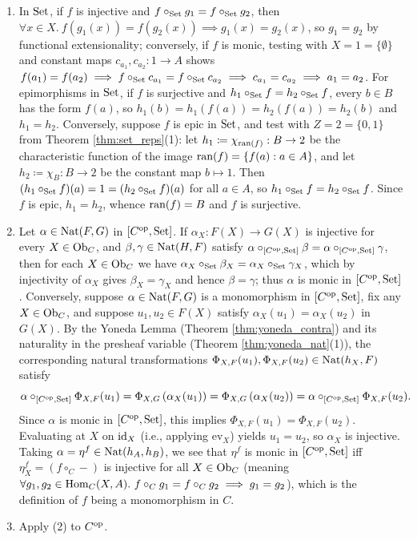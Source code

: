 \documentclass[10pt,a4paper]{article}
\begin{document}
\begin{enumerate}
\item In ${\textrm{Set}}$, if $f$ is injective and $f \circ_{\textrm{Set}} g_1 = f \circ_{\textrm{Set}} g_2$, then $\forall x \in X.\ f(g_1(x)) = f(g_2(x)) \implies g_1(x) = g_2(x)$, so $g_1 = g_2$ by functional extensionality; conversely, if $f$ is monic, testing with $X = 1 = \{\emptyset\}$ and constant maps $c_{a_1}, c_{a_2} : 1 \to A$ shows $f(a_1) = f(a_2) \implies f \circ_{\textrm{Set}} c_{a_1} = f \circ_{\textrm{Set}} c_{a_2} \implies c_{a_1} = c_{a_2} \implies a_1 = a_2$. For epimorphisms in ${\textrm{Set}}$, if $f$ is surjective and $h_1 \circ_{\textrm{Set}} f = h_2 \circ_{\textrm{Set}} f$, every $b \in B$ has the form $f(a)$, so $h_1(b) = h_1(f(a)) = h_2(f(a)) = h_2(b)$ and $h_1 = h_2$. Conversely, suppose $f$ is epic in ${\textrm{Set}}$, and test with $Z = 2 = \{0, 1\}$ from Theorem \ref{thm:set_reps}(1): let $h_1 \coloneqq \chi_{{\textrm{ran}}(f)} : B \to 2$ be the characteristic function of the image ${\textrm{ran}}(f) = \{f(a) : a \in A\}$, and let $h_2 \coloneqq \chi_B : B \to 2$ be the constant map $b \mapsto 1$. Then $(h_1 \circ_{\textrm{Set}} f)(a) = 1 = (h_2 \circ_{\textrm{Set}} f)(a)$ for all $a \in A$, so $h_1 \circ_{\textrm{Set}} f = h_2 \circ_{\textrm{Set}} f$. Since $f$ is epic, $h_1 = h_2$, whence ${\textrm{ran}}(f) = B$ and $f$ is surjective.
\item Let $\alpha \in {\textrm{Nat}}(F, G)$ in $[C^{\textrm{op}}, {\textrm{Set}}]$. If $\alpha_X : F(X) \to G(X)$ is injective for every $X \in {\textrm{Ob}}_C$, and $\beta, \gamma \in {\textrm{Nat}}(H, F)$ satisfy $\alpha \circ_{[C^{\textrm{op}},{\textrm{Set}}]} \beta = \alpha \circ_{[C^{\textrm{op}},{\textrm{Set}}]} \gamma$, then for each $X \in {\textrm{Ob}}_C$ we have $\alpha_X \circ_{\textrm{Set}} \beta_X = \alpha_X \circ_{\textrm{Set}} \gamma_X$, which by injectivity of $\alpha_X$ gives $\beta_X = \gamma_X$ and hence $\beta = \gamma$; thus $\alpha$ is monic in $[C^{\textrm{op}}, {\textrm{Set}}]$. Conversely, suppose $\alpha \in {\textrm{Nat}}(F, G)$ is a monomorphism in $[C^{\textrm{op}}, {\textrm{Set}}]$, fix any $X \in {\textrm{Ob}}_C$, and suppose $u_1, u_2 \in F(X)$ satisfy $\alpha_X(u_1) = \alpha_X(u_2)$ in $G(X)$. By the Yoneda Lemma (Theorem \ref{thm:yoneda_contra}) and its naturality in the presheaf variable (Theorem \ref{thm:yoneda_nat}(1)), the corresponding natural transformations $\Phi_{X,F}(u_1), \Phi_{X,F}(u_2) \in {\textrm{Nat}}(h_X, F)$ satisfy
$$\alpha \circ_{[C^{\textrm{op}},{\textrm{Set}}]} \Phi_{X,F}(u_1) = \Phi_{X,G}\left(\alpha_X(u_1)\right) = \Phi_{X,G}\left(\alpha_X(u_2)\right) = \alpha \circ_{[C^{\textrm{op}},{\textrm{Set}}]} \Phi_{X,F}(u_2).$$
Since $\alpha$ is monic in $[C^{\textrm{op}}, {\textrm{Set}}]$, this implies $\Phi_{X,F}(u_1) = \Phi_{X,F}(u_2)$. Evaluating at $X$ on ${\textrm{id}}_X$ (i.e., applying $\mathrm{ev}_X$) yields $u_1 = u_2$, so $\alpha_X$ is injective. Taking $\alpha = \eta^f \in {\textrm{Nat}}(h_A, h_B)$, we see that $\eta^f$ is monic in $[C^{\textrm{op}}, {\textrm{Set}}]$ iff $\eta^f_X = (f \circ_C -)$ is injective for all $X \in {\textrm{Ob}}_C$ (meaning $\forall g_1, g_2 \in {\textrm{Hom}}_C(X,A).\ f \circ_C g_1 = f \circ_C g_2 \implies g_1 = g_2$), which is the definition of $f$ being a monomorphism in $C$.
\item Apply (2) to $C^{\textrm{op}}$.
\end{enumerate}
\myqed
\end{document}

